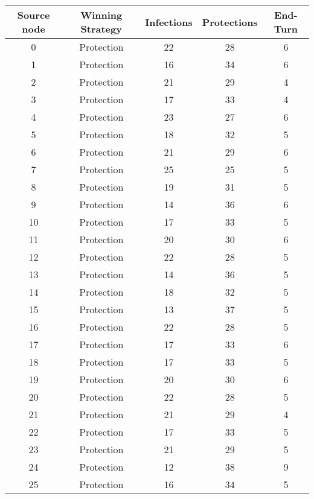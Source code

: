 \documentclass[results.tex]{subfiles}
\begin{document}
\begin{center}
  \begin{tabular}{| c || c | c | c | c |}
    \hline
    {\bfseries Source node} & {\bfseries Winning Strategy} & {\bfseries Infections} & {\bfseries Protections} & {\bfseries End-Turn} \\  %
    \hline\hline
    0 & Protection & 22 & 28 & 6 \\ 
    \hline
    1 & Protection & 16 & 34 & 6 \\ 
    \hline
    2 & Protection & 21 & 29 & 4 \\ 
    \hline
    3 & Protection & 17 & 33 & 4 \\ 
    \hline
    4 & Protection & 23 & 27 & 6 \\ 
    \hline
    5 & Protection & 18 & 32 & 5 \\ 
    \hline
    6 & Protection & 21 & 29 & 6 \\ 
    \hline
    7 & Protection & 25 & 25 & 5 \\ 
    \hline
    8 & Protection & 19 & 31 & 5 \\ 
    \hline
    9 & Protection & 14 & 36 & 6 \\ 
    \hline
    10 & Protection & 17 & 33 & 5 \\ 
    \hline
    11 & Protection & 20 & 30 & 6 \\ 
    \hline
    12 & Protection & 22 & 28 & 5 \\ 
    \hline
    13 & Protection & 14 & 36 & 5 \\ 
    \hline
    14 & Protection & 18 & 32 & 5 \\ 
    \hline
    15 & Protection & 13 & 37 & 5 \\ 
    \hline
    16 & Protection & 22 & 28 & 5 \\ 
    \hline
    17 & Protection & 17 & 33 & 6 \\ 
    \hline
    18 & Protection & 17 & 33 & 5 \\ 
    \hline
    19 & Protection & 20 & 30 & 6 \\ 
    \hline
    20 & Protection & 22 & 28 & 5 \\ 
    \hline
    21 & Protection & 21 & 29 & 4 \\ 
    \hline
    22 & Protection & 17 & 33 & 5 \\ 
    \hline
    23 & Protection & 21 & 29 & 5 \\ 
    \hline
    24 & Protection & 12 & 38 & 9 \\ 
    \hline
    25 & Protection & 16 & 34 & 5 \\ 

\end{tabular}
\end{center}
\end{document}
